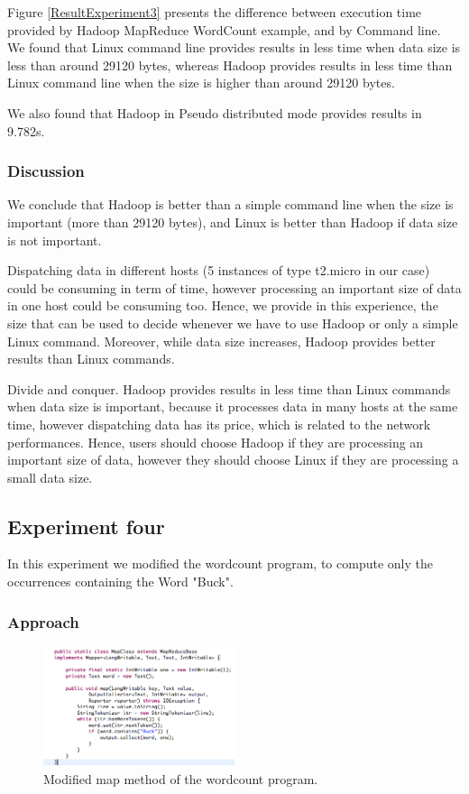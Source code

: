 \documentclass[10pt, conference]{IEEEtran}
\begin{document}
Figure \ref{ResultExperiment3} presents the difference between execution time provided by Hadoop MapReduce WordCount example, and by Command line. We found that Linux command line provides results in less time when data size is less than around 29120 bytes, whereas Hadoop provides results in less time than Linux command line when the size is higher than around 29120 bytes. 

We also found that Hadoop in Pseudo distributed mode provides results in 9.782s.

\subsubsection{Discussion}
We conclude that Hadoop is better than a simple command line when the size is important (more than 29120 bytes), and Linux is better than Hadoop if data size is not important. 


Dispatching data in different hosts (5 instances of type t2.micro in our case) could be consuming in term of time, however processing an important size of data in one host could be consuming too. Hence, we provide in this experience, the size that can be used to decide whenever we have to use Hadoop or only a simple Linux command. Moreover, while data size increases, Hadoop provides better results than Linux commands. 

Divide and conquer. Hadoop provides results in less time than Linux commands when data size is important, because it processes data in many hosts at the same time, however dispatching data has its price, which is related to the network performances. Hence, users should choose Hadoop if they are processing an important size of data, however they should choose Linux if they are processing a small data size.


\subsection{Experiment four}
In this experiment we modified the wordcount program, to compute only the occurrences containing the Word "Buck".
\subsubsection{Approach}


\begin{figure}
	\includegraphics[width=0.5\textwidth]{plots/experiment4.png}
	\caption{\label{ResultExperiment4} Modified map method of the wordcount program.}
\end{figure}
\end{document}
